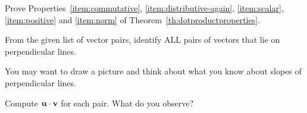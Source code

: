\documentclass{ximera}
\begin{document}
\begin{problem}\label{prob:th:dotprductproperties}
  Prove Properties~\ref{item:commutative}, \ref{item:distributive-again}, \ref{item:scalar}, \ref{item:positive} and \ref{item:norm} of Theorem~\ref{th:dotproductproperties}.
\end{problem}

\begin{problem}\label{prob:perpvectors1}
From the given list of vector pairs, identify ALL pairs of vectors that lie on perpendicular lines.
\begin{hint}
You may want to draw a picture and think about what you know about slopes of perpendicular lines.
\end{hint}
\begin{selectAll}
\end{selectAll}
Compute $\mathbf{u}\cdot\mathbf{v}$ for each pair.  What do you observe? 
\end{problem}
\end{document}
